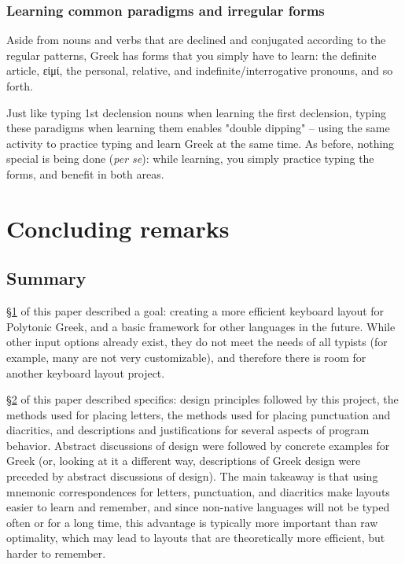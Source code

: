 \documentclass[11pt]{article}
\begin{document}
\subsubsection{Learning common paradigms and irregular forms}
\label{sec:org39d0fc2}

Aside from nouns and verbs that are declined and conjugated according to the regular patterns, Greek has forms that you simply have to learn: the definite article, εἰμί, the personal, relative, and indefinite/interrogative pronouns, and so forth.

Just like typing 1st declension nouns when learning the first declension, typing these paradigms when learning them enables "double dipping" -- using the same activity to practice typing and learn Greek at the same time. As before, nothing special is being done (\emph{per se}): while learning, you simply practice typing the forms, and benefit in both areas.

\section{Concluding remarks}
\label{sec:org0ffeb75}

\subsection{Summary}
\label{sec:org51dc983}

\hyperref[sec:org87caff2]{§1} of this paper described a goal: creating a more efficient keyboard layout for Polytonic Greek, and a basic framework for other languages in the future. While other input options already exist, they do not meet the needs of all typists (for example, many are not very customizable), and therefore there is room for another keyboard layout project.

\hyperref[sec:org5623cd4]{§2} of this paper described specifics: design principles followed by this project, the methods used for placing letters, the methods used for placing punctuation and diacritics, and descriptions and justifications for several aspects of program behavior. Abstract discussions of design were followed by concrete examples for Greek (or, looking at it a different way, descriptions of Greek design were preceded by abstract discussions of design). The main takeaway is that using mnemonic correspondences for letters, punctuation, and diacritics make layouts easier to learn and remember, and since non-native languages will not be typed often or for a long time, this advantage is typically more important than raw optimality, which may lead to layouts that are theoretically more efficient, but harder to remember.
\end{document}
